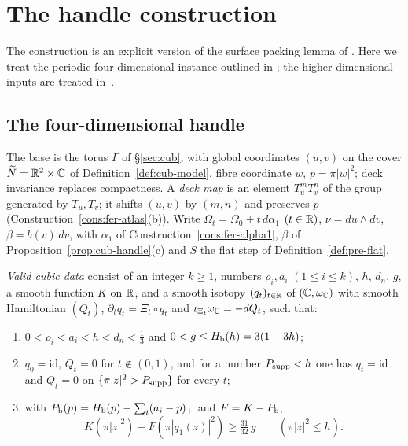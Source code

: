 \section{The handle construction}\label{sec:shd}

The construction is an explicit version of the surface packing lemma of \cite[\S3.2]{OpenAI2026}. Here we treat the periodic four-dimensional instance outlined in ; the higher-dimensional inputs are treated in~\cite{SongHD}.

\subsection{The four-dimensional handle}\label{sec:shd-four}

The base is the torus $\Gamma$ of \S\ref{sec:cub}, with global coordinates $(u,v)$ on the cover $\widetilde N=\mathbb{R}^2\times\mathbb{C}$ of Definition~\ref{def:cub-model}, fibre coordinate $w$, $p=\pi|w|^2$; deck invariance replaces compactness. A \emph{deck map} is an element $T_u^mT_v^n$ of the group generated by $T_u,T_v$; it shifts $(u,v)$ by $(m,n)$ and preserves $p$ (Construction~\ref{cons:fer-atlas}(b)). Write $\Omega_t=\Omega_0+t\,d\alpha_1$ $(t\in\mathbb{R})$, $\nu=du\wedge dv$, $\beta=b(v)\,dv$, with $\alpha_1$ of Construction~\ref{cons:fer-alpha1}, $\beta$ of Proposition~\ref{prop:cub-handle}(c) and $S$ the flat step of Definition~\ref{def:pre-flat}.

\begin{definition}\label{def:shd4-data}
\emph{Valid cubic data} consist of an integer $k\ge1$, numbers $\rho_i,a_i$ $(1\le i\le k)$, $h$, $d_n$, $g$, a smooth
function $K$ on $\mathbb{R}$, and a smooth isotopy $(q_t)_{t\in\mathbb{R}}$ of $(\mathbb{C},\omega_{\mathbb{C}})$ with smooth Hamiltonian $(Q_t)$,
$\partial_tq_t=\Xi_t\circ q_t$ and $\iota_{\Xi_t}\omega_{\mathbb{C}}=-dQ_t$, such that:
\begin{enumerate}[label=(\alph*)]
\item $0<\rho_i<a_i<h<d_n<\frac13$ and $0<g\le H_{\mathrm b}(h)=3(1-3h)$;
\item $q_0=\mathrm{id}$, $Q_t=0$ for $t\notin(0,1)$, and for a number $P_{\rm supp}<h$ one has $q_t=\mathrm{id}$ and $Q_t=0$
on $\{\pi|z|^2>P_{\rm supp}\}$ for every $t$;
\item with $P_{\mathrm b}(p)=H_{\mathrm b}(p)-\sum_i(a_i-p)_+$ and $F=K-P_{\mathrm b}$,
\begin{equation}\label{eq:shd4-comparison}
 K(\pi|z|^2)-F(\pi|q_1(z)|^2)\ge\tfrac{31}{32}\,g\qquad(\pi|z|^2\le h).
\end{equation}
\end{enumerate}
\end{definition}

